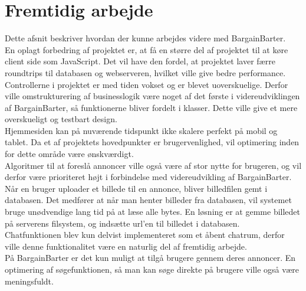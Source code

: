 \chapter{Fremtidig arbejde}
Dette afsnit beskriver hvordan der kunne arbejdes videre med BargainBarter.\\


\noindent En oplagt forbedring af projektet er, at få en større del af projektet til at køre client side som JavaScript. Det vil have den fordel, at projektet laver færre roundtrips til databasen og webserveren, hvilket ville give bedre performance.\\ 

\noindent Controllerne i projektet er med tiden vokset og er blevet uoverskuelige. Derfor ville omstrukturering af businesslogik være noget af det første i videreudviklingen af BargainBarter, så funktionerne bliver fordelt i klasser. Dette ville give et mere overskueligt og testbart design.\\

\noindent Hjemmesiden kan på nuværende tidspunkt ikke skalere perfekt på mobil og tablet. Da et af projektets hovedpunkter er brugervenlighed, vil optimering inden for dette område være ønskværdigt.\\

\noindent Algoritmer til at foreslå annoncer ville også være af stor nytte for brugeren, og vil derfor være prioriteret højt i forbindelse med videreudvikling af BargainBarter. \\

\noindent Når en bruger uploader et billede til en annonce, bliver billedfilen gemt i databasen. Det medfører at når man henter billeder fra databasen, vil systemet bruge unødvendige lang tid på at læse alle bytes. En løsning er at gemme billedet på serverens filsystem, og indsætte url'en til billedet i databasen. \\

\noindent Chatfunktionen blev kun delvist implementeret som et åbent chatrum, derfor ville denne funktionalitet være en naturlig del af fremtidig arbejde. \\

\noindent På BargainBarter er det kun muligt at tilgå brugere gennem deres annoncer. En optimering af søgefunktionen, så man kan søge direkte på brugere ville også være meningsfuldt.
 